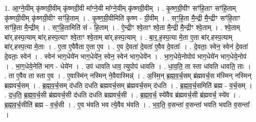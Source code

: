 \documentclass[17pt]{extarticle}
\begin{document}
1. आ॒ग्ने॒यीम् कृ॑ष्णग्री॒वीम् कृ॑ष्णग्री॒वी मा᳚ग्ने॒यी मा᳚ग्ने॒यीम् कृ॑ष्णग्री॒वीम् । . कृ॒ष्ण॒ग्री॒वीꣳ सꣳ॑हि॒ताꣳ सꣳ॑हि॒ताम् कृ॑ष्णग्री॒वीम् कृ॑ष्णग्री॒वीꣳ सꣳ॑हि॒ताम् । . कृ॒ष्ण॒ग्री॒वीमिति॑ कृष्ण - ग्री॒वीम् । . सꣳ॒॒हि॒ता मै॒न्द्री मै॒न्द्रीꣳ सꣳ॑हि॒ताꣳ सꣳ॑हि॒ता मै॒न्द्रीम् । . सꣳ॒॒हि॒तामिति॑ सं - हि॒ताम् । . ऐ॒न्द्रीꣳ श्वे॒ताꣳ श्वे॒ता मै॒न्द्री मै॒न्द्रीꣳ श्वे॒ताम् । . श्वे॒ताम् बा॑र्.हस्प॒त्याम् बा॑र्.हस्प॒त्याꣳ श्वे॒ताꣳ श्वे॒ताम् बा॑र्.हस्प॒त्याम् । . बा॒र्॒.ह॒स्प॒त्या मे॒ता ए॒ता बा॑र्.हस्प॒त्याम् बा॑र्.हस्प॒त्या मे॒ताः । . ए॒ता ए॒वैवैता ए॒ता ए॒व । . ए॒व दे॒वता॑ दे॒वता॑ ए॒वैव दे॒वताः᳚ । . दे॒वताः॒ स्वेन॒ स्वेन॑ दे॒वता॑ दे॒वताः॒ स्वेन॑ । . स्वेन॑ भाग॒धेये॑न भाग॒धेये॑न॒ स्वेन॒ स्वेन॑ भाग॒धेये॑न । . भा॒ग॒धेये॒नोपोप॑ भाग॒धेये॑न भाग॒धेये॒नोप॑ । . भा॒ग॒धेये॒नेति॑ भाग - धेये॑न । . उप॑ धावति धाव॒ त्युपोप॑ धावति । . धा॒व॒ति॒ ता स्ता धा॑वति धावति॒ ताः । . ता ए॒वैव ता स्ता ए॒व । . ए॒वास्मि॑न् नस्मिन् ने॒वैवास्मिन्न्॑ । . अ॒स्मि॒न् ब्र॒ह्म॒व॒र्च॒सम् ब्र॑ह्मवर्च॒स म॑स्मिन् नस्मिन् ब्रह्मवर्च॒सम् । . ब्र॒ह्म॒व॒र्च॒सम् द॑धति दधति ब्रह्मवर्च॒सम् ब्र॑ह्मवर्च॒सम् द॑धति । . ब्र॒ह्म॒व॒र्च॒समिति॑ ब्रह्म - व॒र्च॒सम् । . द॒ध॒ति॒ ब्र॒ह्म॒व॒र्च॒सी ब्र॑ह्मवर्च॒सी द॑धति दधति ब्रह्मवर्च॒सी । . ब्र॒ह्म॒व॒र्च॒ स्ये॑वैव ब्र॑ह्मवर्च॒सी ब्र॑ह्मवर्च॒ स्ये॑व । . ब्र॒ह्म॒व॒र्च॒सीति॑ ब्रह्म - व॒र्च॒सी । . ए॒व भ॑वति भव त्ये॒वैव भ॑वति । . भ॒व॒ति॒ व॒सन्ता॑ व॒सन्ता॑ भवति भवति व॒सन्ता᳚ । \newline
\end{document}
